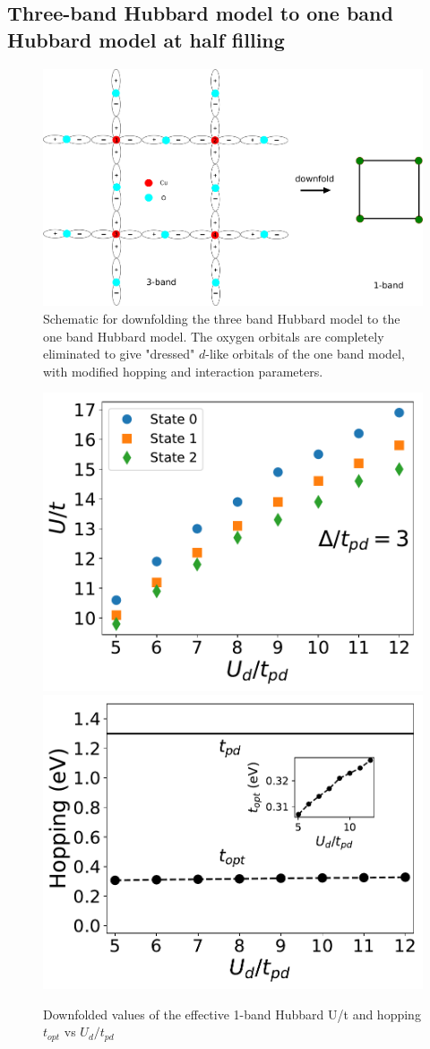 \documentclass[prl,12pt,onecolumn,nofootinbib,notitlepage,english,superscriptaddress]{revtex4-1}
\begin{document}
\subsection{Three-band Hubbard model to one band Hubbard model at half filling}

\begin{figure}[htpb]
\centering
\includegraphics[width=1\linewidth]{./three_band_figure.pdf}
\caption{Schematic for downfolding the three band Hubbard model to the one band Hubbard model. 
The oxygen orbitals are completely eliminated to give "dressed" $d$-like orbitals of the one band model, with modified hopping 
and interaction parameters.}
\label{fig:hamfit} 
\end{figure}	

\begin{figure}[htpb]
\centering
\includegraphics[width=0.49\linewidth]{./downfolded_U.pdf}
\includegraphics[width=0.49\linewidth]{./Hopping_vs_U.pdf}
\caption{Downfolded values of the effective 1-band Hubbard U/t and hopping $t_{opt}$ vs $U_d/t_{pd}$}
\label{fig:hamfit} 
\end{figure}	
\end{document}
